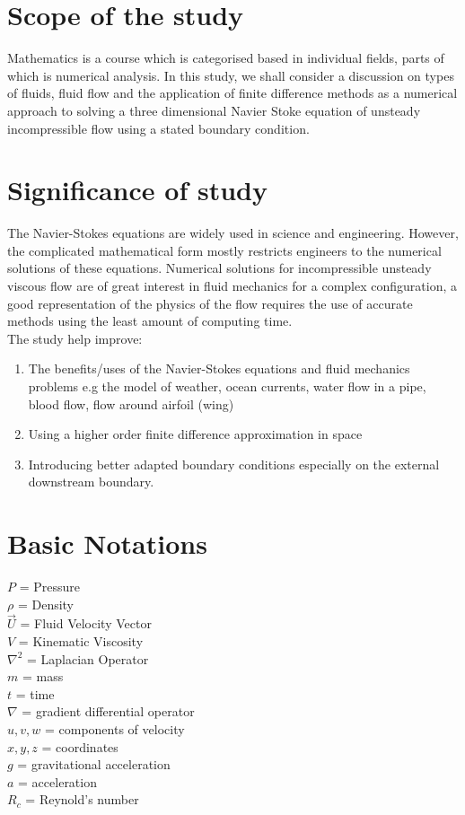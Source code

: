 \documentclass[11pt]{report}
\newcommand{\NI}{\noindent}
\begin{document}
	\section{Scope of the study}
	Mathematics is a course which is categorised based in individual fields, parts of which is numerical analysis. In this study, we shall consider a discussion on types of fluids, fluid flow and the application of finite difference methods as a numerical approach to solving a three dimensional Navier Stoke equation of unsteady incompressible flow using a stated boundary condition.
	
	
	\section{Significance of study}
	The Navier-Stokes equations are widely used in science and engineering. However, the complicated mathematical form mostly restricts engineers to the numerical solutions of these equations. Numerical solutions for incompressible unsteady viscous flow are of great interest in fluid mechanics for a complex configuration, a good representation of the physics of the flow requires the use of accurate methods using the least amount of computing time. \\
	
	\NI The study help improve:
	\begin{enumerate}
		\item The benefits/uses of the Navier-Stokes equations and fluid mechanics problems e.g the model of weather, ocean currents, water flow in a pipe, blood flow, flow around airfoil (wing)
		
		\item Using a higher order finite difference approximation in space
		
		\item Introducing better adapted boundary conditions especially on the external downstream boundary.
	\end{enumerate}
	

	\section{Basic Notations}
	$P$ = Pressure\\
	$\rho$ = Density \\
	$\vec{U}$ = Fluid Velocity Vector\\
	$V$ = Kinematic Viscosity\\
	$\nabla^2$ = Laplacian Operator\\
	$m$ = mass\\
	$t$ = time\\
	$\nabla$ = gradient differential operator\\
	$u,v,w$ = components of velocity\\
	$x,y,z$ = coordinates\\
	$g$ = gravitational acceleration\\
	$a$ = acceleration\\
	$R_c$ = Reynold's number
\end{document}
